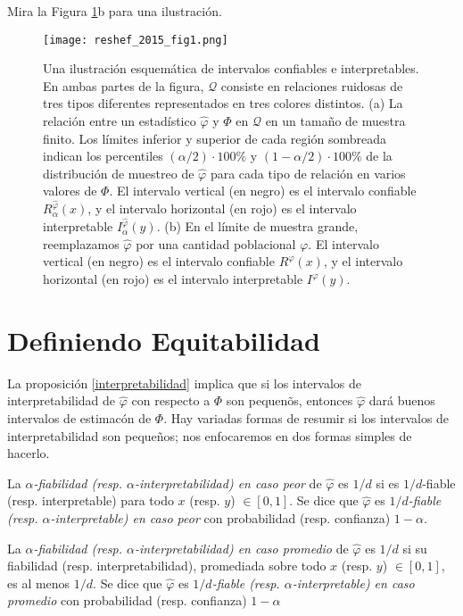 	Mira la Figura \ref{reshef_2015_f1}b para una ilustraci\'on.

	\begin{figure}[H] 
		\centering
		\texttt{[image: reshef\_2015\_fig1.png]}
		\caption{
			\label{reshef_2015_f1}
			Una ilustraci\'on esquem\'atica de intervalos confiables e interpretables. En ambas partes de la figura, $\mathcal{Q}$ consiste en relaciones ruidosas de tres tipos diferentes representados en tres colores distintos. (a) La relaci\'on entre un estad\'istico $\hat{\varphi}$ y $\Phi$ en $\mathcal{Q}$ en un tama\~no de muestra finito. Los l\'imites inferior y superior de cada regi\'on sombreada indican los percentiles $(\alpha / 2) \cdot 100 \%$ y $(1 - \alpha / 2) \cdot 100 \%$ de la distribuci\'on de muestreo de $\hat{\varphi}$ para cada tipo de relaci\'on en varios valores de $\Phi$. El intervalo vertical (en negro) es el intervalo confiable $R_\alpha^{\hat{\varphi}}(x)$, y el intervalo horizontal (en rojo) es el intervalo interpretable $I_\alpha^{\hat{\varphi}}(y)$. (b) En el l\'imite de muestra grande, reemplazamos $\hat{\varphi}$ por una cantidad poblacional $\varphi$. El intervalo vertical (en negro) es el intervalo confiable $R^{\varphi}(x)$, y el intervalo horizontal (en rojo) es el intervalo interpretable $I^{\varphi}(y)$.}
	\end{figure}

	\section{Definiendo Equitabilidad}

	La proposici\'on \ref{interpretabilidad} implica que si los intervalos de interpretabilidad de $\hat{\varphi}$ con respecto a $\Phi$ son pequen\~os, entonces $\hat{\varphi}$ dar\'a buenos intervalos de estimac\'on de $\Phi$. Hay variadas formas de resumir si los intervalos de interpretabilidad son peque\~nos; nos enfocaremos en dos formas simples de hacerlo.
	
	\begin{defn}
		La \textit{$\alpha$-fiabilidad (resp. $\alpha$-interpretabilidad) en caso peor} de $\hat{\varphi}$ es $1/d$ si es $1/d$-fiable (resp. interpretable) para todo $x$ (resp. $y$) $\in [0,1]$. Se dice que $\hat{\varphi}$ es \textit{$1/d$-fiable (resp. $\alpha$-interpretable) en caso peor} con probabilidad (resp. confianza) $1-\alpha$.

		La \textit{$\alpha$-fiabilidad (resp. $\alpha$-interpretabilidad) en caso promedio} de $\hat{\varphi}$ es $1/d$ si su fiabilidad (resp. interpretabilidad), promediada sobre todo $x$ (resp. $y$) $\in [0,1]$, es al menos $1/d$. Se dice que $\hat{\varphi}$ es \textit{$1/d$-fiable (resp. $\alpha$-interpretable) en caso promedio} con probabilidad (resp. confianza) $1-\alpha$
	\end{defn}

